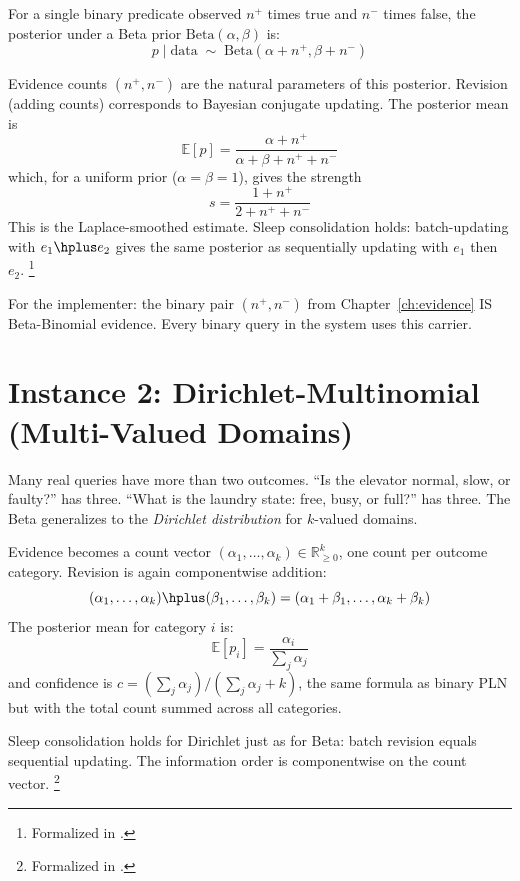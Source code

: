 \documentclass[11pt,openany]{report}
\begin{document}
For a single binary predicate observed $n^+$ times true and $n^-$ times
false, the posterior under a Beta prior $\text{Beta}(\alpha, \beta)$ is:
\[
  p \mid \text{data} \;\sim\; \text{Beta}(\alpha + n^+, \beta + n^-)
\]

Evidence counts $(n^+, n^-)$ are the natural parameters of this
posterior.  Revision (adding counts) corresponds to Bayesian conjugate
updating.  The posterior mean is
\[
  \mathbb{E}[p] = \frac{\alpha + n^+}{\alpha + \beta + n^+ + n^-}
\]
which, for a uniform prior ($\alpha = \beta = 1$), gives the strength
\[
  s = \frac{1 + n^+}{2 + n^+ + n^-}
\]
This is the Laplace-smoothed estimate.  Sleep consolidation holds:
batch-updating with $e_1 \hplus e_2$ gives the same posterior as
sequentially updating with $e_1$ then $e_2$.%
\footnote{Formalized in .}

For the implementer: the binary pair $(n^+, n^-)$ from
Chapter~\ref{ch:evidence} IS Beta-Binomial evidence.  Every binary
query in the system uses this carrier.

\section{Instance 2: Dirichlet-Multinomial (Multi-Valued Domains)}

Many real queries have more than two outcomes.  ``Is the elevator
normal, slow, or faulty?'' has three.  ``What is the laundry state:
free, busy, or full?'' has three.  The Beta generalizes to the
\emph{Dirichlet distribution} for $k$-valued domains.

Evidence becomes a count vector $(\alpha_1, \ldots, \alpha_k) \in
\mathbb{R}_{\ge 0}^k$, one count per outcome category.  Revision is
again componentwise addition:
\[
  (\alpha_1, \ldots, \alpha_k) \hplus (\beta_1, \ldots, \beta_k)
  = (\alpha_1 + \beta_1, \ldots, \alpha_k + \beta_k)
\]
The posterior mean for category $i$ is:
\[
  \mathbb{E}[p_i] = \frac{\alpha_i}{\sum_j \alpha_j}
\]
and confidence is $c = (\sum_j \alpha_j) / (\sum_j \alpha_j + k)$,
the same formula as binary PLN but with the total count summed
across all categories.

Sleep consolidation holds for Dirichlet just as for Beta: batch
revision equals sequential updating.  The information order is
componentwise on the count vector.%
\footnote{Formalized in .}

\end{document}
